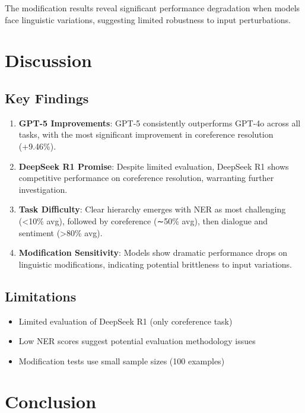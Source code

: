 \documentclass[11pt]{article}
\begin{document}
The modification results reveal significant performance degradation when models face linguistic 
variations, suggesting limited robustness to input perturbations.

\section{Discussion}

\subsection{Key Findings}

\begin{enumerate}
    \item \textbf{GPT-5 Improvements}: GPT-5 consistently outperforms GPT-4o across all tasks, 
          with the most significant improvement in coreference resolution (+9.46\%).
    
    \item \textbf{DeepSeek R1 Promise}: Despite limited evaluation, DeepSeek R1 shows competitive 
          performance on coreference resolution, warranting further investigation.
    
    \item \textbf{Task Difficulty}: Clear hierarchy emerges with NER as most challenging (<10\% avg), 
          followed by coreference (∼50\% avg), then dialogue and sentiment (>80\% avg).
    
    \item \textbf{Modification Sensitivity}: Models show dramatic performance drops on linguistic 
          modifications, indicating potential brittleness to input variations.
\end{enumerate}

\subsection{Limitations}

\begin{itemize}
    \item Limited evaluation of DeepSeek R1 (only coreference task)
    \item Low NER scores suggest potential evaluation methodology issues
    \item Modification tests use small sample sizes (100 examples)
\end{itemize}

\section{Conclusion}
\end{document}
